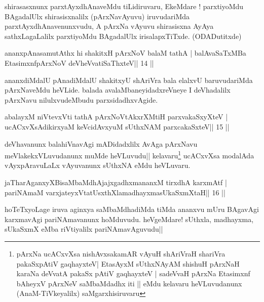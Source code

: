 \begin{artha}
shirasasxnunx parxtAyxdhAnaveMdu tiLidiruvaru, EkeMdare ! parxtiyoMdu
BAgadalUlx shirasisxnalilx (pArxNavAyuvu) iruvudariMda
parxtAyxdhAnavenunxvudu, A pArxNa vAyuvu shirasisxna AyAya
sathxLagaLalilx parxtiyoMdu BAgadalUlx irisalapxTiTxde. (ODADutitxde)
\end{artha}



\begin{shl}
ananxpAnasamutAthx hi shakitxH pArxNoV balaM tathA |
balAvaSaTxMBa EtasimxnfpArxNoV deVheV\s vatiSaThxteV\hfill || 14 ||
\end{shl}

\begin{artha}
ananxdiMdalU pAnadiMdalU shakitxyU shAriVra bala elalxvU baruvudariMda pArxNaveMdu heVLide. balada avalaMbaneyidadxreVneye I deVhadalilx pArxNavu nilulxvudeMbudu parxsidadhxvAgide.
\end{artha}



\begin{shl}
abalayxM niVtevxVti tathA pArxNoVtAkxrXMtiH parxvakaSxyXteV |
ucACxvXsAdikirxyaM keVcidAvxyuM sUthxNAM parxcakaSxteV\hfill || 15 ||
\end{shl}

\begin{artha}
deVhavanunx balahiVnavAgi mADidadxlilx AvAga pArxNavu
meVlakekxVLuvudanunx muMde heVLuvudu|| kelavaru\footnote{pArxNa
  ucACxvXsa nishAvxsakamAR vAyuH shAriVraH shariVra pakaSxpAtiV
  gaqhayxteV| EtasAyxM sUthxNAyAM shishuH pArxNaH karaNa deVvatA
  pakaSx pAtiV gaqhayxteV | sadeVvaH pArxNa Etasimxnf bAheyxV pArxNeV
  saMbaMdadhx iti || eMdu kelavaru heVLuvudanunx (AnaM-TiVkeyalilx) saMgarxhisiruvaru} ucACxvXsa modalAda
vAyxpAravuLaLx vAyuvanunx sUthxNA eMdu heVLuvaru.
\end{artha}

\begin{shl}
jaTharAganxyXBisaMbaMdhAjajxgadhxmananxM tirxdhA karxmAtf |
pariNAmaM varxjateyxVtatUsxthXlamadhayxmasUkaSxmXtaH\hfill || 16 ||
\end{shl}

\begin{artha}
hoTeTxyoLage iruva aginxya saMbaMdhadiMda tiMda ananxvu mUru BAgavAgi
karxmavAgi pariNAmavanunx hoMduvudu. heVgeMdare! sUthxla, madhayxma,
sUkaSxmX eMba riVtiyalilx pariNAmavAguvudu|| 
\end{artha}

